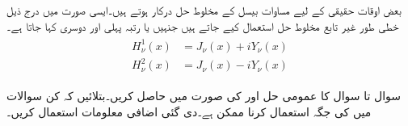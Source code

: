 بعض اوقات حقیقی  کے لیے مساوات بیسل کے مخلوط حل درکار ہوتے ہیں۔ایسی صورت میں درج ذیل خطی طور غیر تابع مخلوط حل  استعمال کیے جاتے ہیں جنہیں  یا رتبہ  پہلی اور دوسری  کہا جاتا ہے۔
\begin{gather}
\begin{aligned}\label{مساوات_بیسل_ہینکل}
H_{\nu}^1(x)&=J_{\nu}(x)+iY_{\nu}(x)\\
H_{\nu}^2(x)&=J_{\nu}(x)-iY_{\nu}(x)
\end{aligned}
\end{gather}

سوال  تا سوال  کا عمومی حل  اور  کی صورت میں حاصل کریں۔بتلائیں کہ کن سوالات میں  کی جگہ  استعمال کرنا ممکن ہے۔دی گئی اضافی معلومات استعمال کریں۔

